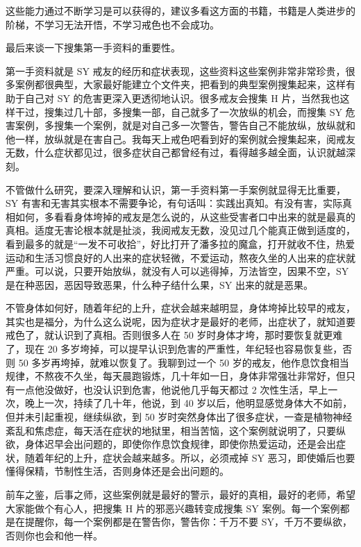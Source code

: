 \documentclass[fontset=founder]{ctexart}
\begin{document}
这些能力通过不断学习是可以获得的，建议多看这方面的书籍，书籍是人类进步的阶梯，不学习无法开悟，不学习戒色也不会成功。

最后来谈一下搜集第一手资料的重要性。

第一手资料就是 SY 戒友的经历和症状表现，这些资料这些案例非常非常珍贵，很多案例都很典型，大家最好能建立个文件夹，把看到的典型案例搜集起来，这样有助于自己对 SY 的危害更深入更透彻地认识。很多戒友会搜集 H 片，当然我也这样干过，搜集过几十部，多搜集一部，自己就多了一次放纵的机会，而搜集 SY 危害案例，多搜集一个案例，就是对自己多一次警告，警告自己不能放纵，放纵就和他一样，放纵就是在害自己。我每天上戒色吧看到好的案例就会搜集起来，阅戒友无数，什么症状都见过，很多症状自己都曾经有过，看得越多越全面，认识就越深刻。

不管做什么研究，要深入理解和认识，第一手资料第一手案例就显得无比重要，SY 有害和无害其实根本不需要争论，有句话叫：实践出真知。有没有害，实际真相如何，多看看身体垮掉的戒友是怎么说的，从这些受害者口中出来的就是最真的真相。适度无害论根本就是扯淡，我阅戒友无数，没见过几个能真正做到适度的，看到最多的就是“一发不可收拾”，好比打开了潘多拉的魔盒，打开就收不住，热爱运动和生活习惯良好的人出来的症状轻微，不爱运动，熬夜久坐的人出来的症状就严重。可以说，只要开始放纵，就没有人可以逃得掉，万法皆空，因果不空，SY 是在种恶因，恶因导致恶果，什么种子结什么果，SY 出来的就是恶果。

不管身体如何好，随着年纪的上升，症状会越来越明显，身体垮掉比较早的戒友，其实也是福分，为什么这么说呢，因为症状才是最好的老师，出症状了，就知道要戒色了，就认识到了真相。否则很多人在 50 岁时身体才垮，那时要恢复就更难了，现在 20 多岁垮掉，可以提早认识到危害的严重性，年纪轻也容易恢复些，否则 50 多岁再垮掉，就难以恢复了。我聊到过一个 50 岁的戒友，他作息饮食相当规律，不熬夜不久坐，每天晨跑锻炼，几十年如一日，身体非常强壮非常好，但只有一点他没做好，也没认识到危害，他说他几乎每天都过 2 次性生活，早上一次，晚上一次，持续了几十年，他说，到 40 岁以后，他明显感觉身体大不如前，但并未引起重视，继续纵欲，到 50 岁时突然身体出了很多症状，一查是植物神经紊乱和焦虑症，每天活在症状的地狱里，相当苦恼，这个案例就说明了，只要纵欲，身体迟早会出问题的，即使你作息饮食规律，即使你热爱运动，还是会出症状，随着年纪的上升，症状会越来越多。所以，必须戒掉 SY 恶习，即使婚后也要懂得保精，节制性生活，否则身体还是会出问题的。

前车之鉴，后事之师，这些案例就是最好的警示，最好的真相，最好的老师，希望大家能做个有心人，把搜集 H 片的邪恶兴趣转变成搜集 SY 案例。每一个案例都是在提醒你，每一个案例都是在警告你，警告你：千万不要 SY，千万不要纵欲，否则你也会和他一样。
\end{document}
